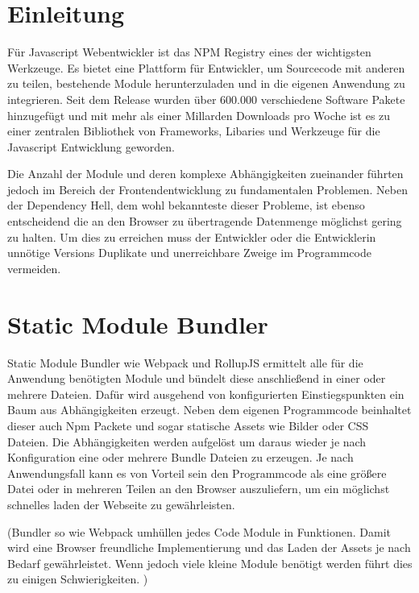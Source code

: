 \section{Einleitung}

Für Javascript Webentwickler ist das NPM Registry eines der wichtigsten Werkzeuge. Es bietet eine Plattform für Entwickler, um Sourcecode mit anderen zu teilen, bestehende Module herunterzuladen und in die eigenen Anwendung zu integrieren. Seit dem Release wurden über 600.000 verschiedene Software Pakete hinzugefügt und mit mehr als einer Millarden Downloads pro Woche ist es zu einer zentralen Bibliothek von Frameworks, Libaries und Werkzeuge für die Javascript Entwicklung geworden. \autocite{Npmdocs}

Die Anzahl der Module und deren komplexe Abhängigkeiten zueinander führten jedoch im Bereich der Frontendentwicklung zu fundamentalen Problemen. Neben der Dependency Hell, dem wohl bekannteste dieser Probleme, ist ebenso entscheidend die an den Browser zu übertragende Datenmenge möglichst gering zu halten. Um dies zu erreichen muss der Entwickler oder die Entwicklerin unnötige Versions Duplikate und unerreichbare Zweige im Programmcode vermeiden.\autocite{DominikWilkowski}

\section{Static Module Bundler}
Static Module Bundler wie Webpack und RollupJS ermittelt alle für die Anwendung benötigten Module und bündelt diese anschließend in einer oder mehrere Dateien. Dafür wird ausgehend von konfigurierten Einstiegspunkten ein Baum aus Abhängigkeiten erzeugt. Neben dem eigenen Programmcode beinhaltet dieser auch Npm Packete und sogar statische Assets wie Bilder oder CSS Dateien. Die Abhängigkeiten werden aufgelöst um daraus wieder je nach Konfiguration eine oder mehrere Bundle Dateien zu erzeugen. Je nach Anwendungsfall kann es von Vorteil sein den Programmcode als eine größere Datei oder in mehreren Teilen an den Browser auszuliefern, um ein möglichst schnelles laden der Webseite zu gewährleisten.
\autocite{RollupJSDocs,WebpackConcepts}

(Bundler so wie Webpack umhüllen jedes Code Module in Funktionen. Damit wird eine Browser freundliche Implementierung und das Laden der Assets je nach Bedarf gewährleistet. Wenn jedoch viele kleine Module benötigt werden führt dies zu einigen Schwierigkeiten. \autocite{RichHarris})

